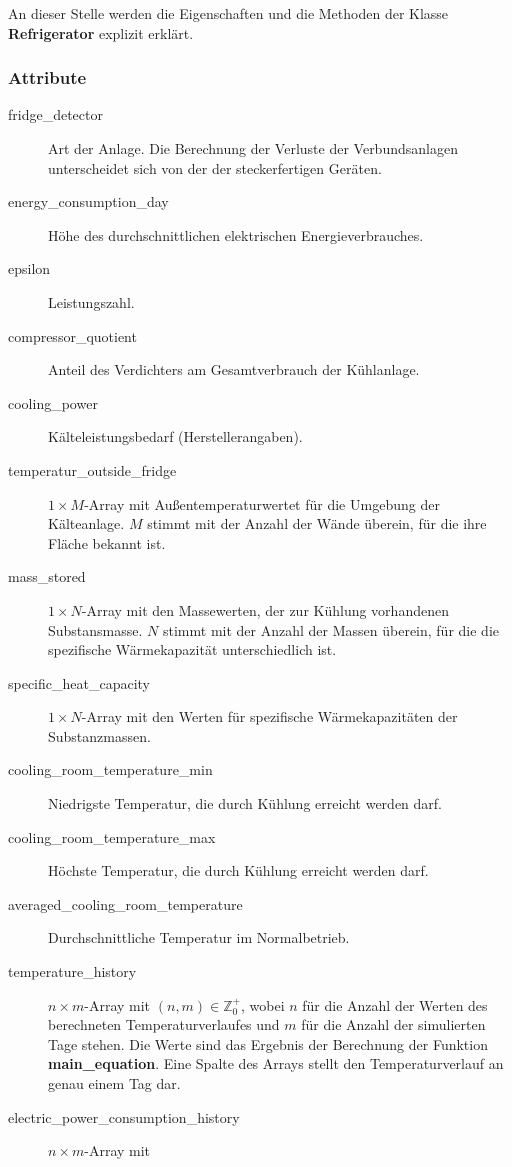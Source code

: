 An dieser Stelle werden die Eigenschaften und die Methoden der Klasse
\textbf{Refrigerator} explizit erkl\"art.

\subsubsection*{Attribute}
\begin{description}
	\item[fridge\_detector] Art der Anlage. Die Berechnung der Verluste der
	Verbundsanlagen unterscheidet sich von der der steckerfertigen
	Ger\"aten.
	\item[energy\_consumption\_day] H\"ohe des durchschnittlichen
	elektrischen Energieverbrauches.
	\item[epsilon] Leistungszahl.
	\item[compressor\_quotient] Anteil des Verdichters am Gesamtverbrauch
	der K\"uhlanlage.
	\item[cooling\_power] K\"alteleistungsbedarf (Herstellerangaben).
	\item[temperatur\_outside\_fridge] $1\times M$-Array mit
	Au\ss entemperaturwertet f\"ur die Umgebung der K\"alteanlage. $M$
	stimmt mit der Anzahl der W\"ande \"uberein, f\"ur die ihre Fl\"ache
	bekannt ist.
	\item[mass\_stored] $1\times N$-Array mit den Massewerten, der zur
	K\"uhlung vorhandenen Substansmasse. $N$ stimmt mit der Anzahl der
	Massen \"uberein, f\"ur die die spezifische W\"armekapazit\"at
	unterschiedlich ist.
	\item[specific\_heat\_capacity] $1\times N$-Array mit den Werten f\"ur
	spezifische W\"armekapazit\"aten der Substanzmassen.
	\item[cooling\_room\_temperature\_min] Niedrigste Temperatur, die durch
	K\"uhlung erreicht werden darf.
	\item[cooling\_room\_temperature\_max] H\"ochste Temperatur, die durch
	K\"uhlung erreicht werden darf.
	\item[averaged\_cooling\_room\_temperature] Durchschnittliche Temperatur
	im Normalbetrieb.
	\item[temperature\_history] $n \times m$-Array mit $(n,m)\in
	\mathbb{Z}^+_0$, wobei $n$ f\"ur die Anzahl der Werten des berechneten
	Temperaturverlaufes und $m$ f\"ur die Anzahl der simulierten Tage
	stehen. Die Werte sind das Ergebnis der
	Berechnung der Funktion \textbf{main\_equation}. Eine Spalte des Arrays
	stellt den Temperaturverlauf an genau einem Tag dar.
	\item[electric\_power\_consumption\_history] $n \times m$-Array mit

\end{description}

